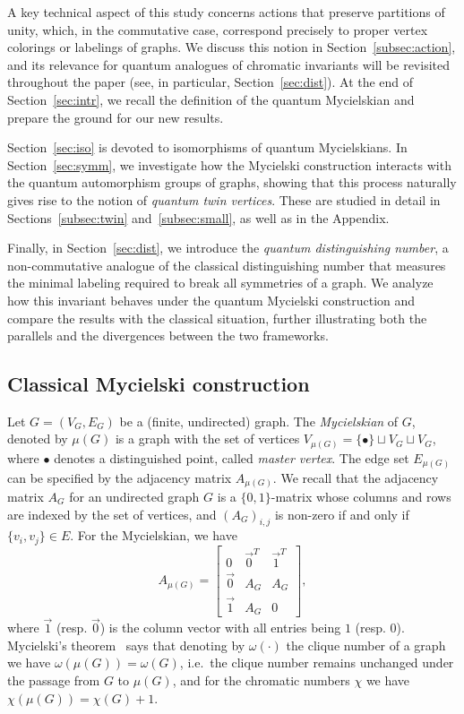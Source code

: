 \documentclass[11pt,reqno]{amsart}
\begin{document}
A key technical aspect of this study concerns actions that preserve partitions of unity, which, in the commutative case, correspond precisely to proper vertex colorings or labelings of graphs. We discuss this notion in Section~\ref{subsec:action}, and its relevance for quantum analogues of chromatic invariants will be revisited throughout the paper (see, in particular, Section~\ref{sec:dist}). At the end of Section~\ref{sec:intr}, we recall the definition of the quantum Mycielskian and prepare the ground for our new results.

Section~\ref{sec:iso} is devoted to isomorphisms of quantum Mycielskians. In Section~\ref{sec:symm}, we investigate how the Mycielski construction interacts with the quantum automorphism groups of graphs, showing that this process naturally gives rise to the notion of \emph{quantum twin vertices}. These are studied in detail in Sections~\ref{subsec:twin} and~\ref{subsec:small}, as well as in the Appendix.

Finally, in Section~\ref{sec:dist}, we introduce the \emph{quantum distinguishing number}, a non-commutative analogue of the classical distinguishing number that measures the minimal labeling required to break all symmetries of a graph. We analyze how this invariant behaves under the quantum Mycielski construction and compare the results with the classical situation, further illustrating both the parallels and the divergences between the two frameworks.

\subsection{Classical Mycielski construction}\label{subsec:class}\hspace*{\fill}

Let $G=(V_G, E_G)$ be a (finite, undirected) graph. The \emph{Mycielskian} of $G$, denoted by $\mu(G)$ is a graph with the set of vertices $V_{\mu(G)}=\{\bullet\}\sqcup V_G\sqcup V_G$, where $\bullet$ denotes a distinguished point, called \emph{master vertex}. The edge set $E_{\mu(G)}$ can be specified by the adjacency matrix $A_{\scriptscriptstyle\mu(G)}$. We recall that the adjacency matrix $A_{\scriptscriptstyle G}$ for an undirected graph $G$ is a $\{0,1\}$-matrix whose columns and rows are indexed by the set of vertices, and $(A_{\scriptscriptstyle G})_{i,j}$ is non-zero if and only if $\{v_i,v_j\}\in E$. For the Mycielskian, we have
\[
A_{\scriptscriptstyle\mu(G)}=\begin{bmatrix}
    0 &\vec{0}^T &\vec{1}^T\\
   \vec{0}& A_{\scriptscriptstyle G} & A_{\scriptscriptstyle G}\\
   \vec{1}& A_{\scriptscriptstyle G} & 0
\end{bmatrix},
\]
where $\vec{1}$ (resp. $\vec{0}$) is the column vector with all entries being $1$ (resp. $0$). Mycielski's theorem~\cite{Mycielski} says that denoting by $\omega(\cdot)$ the clique number of a graph we have $\omega(\mu(G))=\omega(G)$, i.e.~the clique number remains unchanged under the passage from $G$ to $\mu(G)$, and for the chromatic numbers $\chi$ we have $\chi(\mu(G))=\chi(G)+1$.
\end{document}

